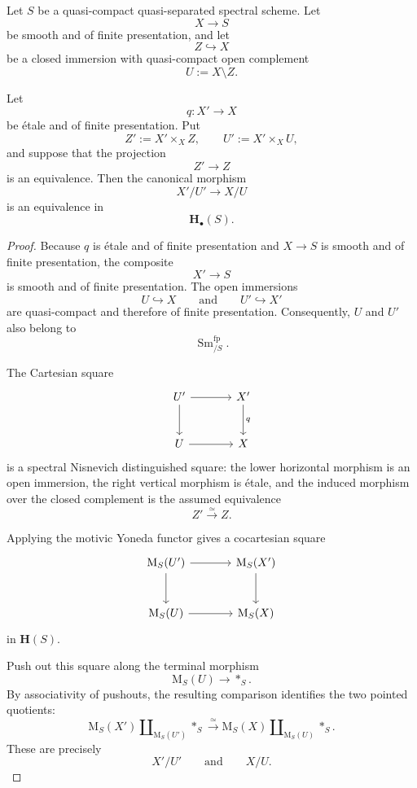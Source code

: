 \begin{proposition}
\label{prop:nisnevich-excision-closed-pairs}
Let \(S\) be a quasi-compact quasi-separated spectral scheme.  Let
\[
    X
    \longrightarrow
    S
\]
be smooth and of finite presentation, and let
\[
    Z
    \hookrightarrow
    X
\]
be a closed immersion with quasi-compact open complement
\[
    U
    :=
    X\setminus Z.
\]

Let
\[
    q
    \colon
    X'
    \longrightarrow
    X
\]
be étale and of finite presentation.  Put
\[
    Z'
    :=
    X'\times_XZ,
    \qquad
    U'
    :=
    X'\times_XU,
\]
and suppose that the projection
\[
    Z'
    \longrightarrow
    Z
\]
is an equivalence.  Then the canonical morphism
\[
    X'/U'
    \longrightarrow
    X/U
\]
is an equivalence in
\[
    \mathbf H_\bullet(S).
\]
\end{proposition}

\begin{proof}
Because \(q\) is étale and of finite presentation and
\(X\to S\) is smooth and of finite presentation, the composite
\[
    X'
    \longrightarrow
    S
\]
is smooth and of finite presentation.  The open immersions
\[
    U
    \hookrightarrow
    X
    \qquad\text{and}\qquad
    U'
    \hookrightarrow
    X'
\]
are quasi-compact and therefore of finite presentation.  Consequently,
\(U\) and \(U'\) also belong to
\[
    \operatorname{Sm}^{\mathrm{fp}}_{/S}.
\]

The Cartesian square
\[
\begin{tikzcd}[column sep=large, row sep=large]
    U'
        \arrow[r]
        \arrow[d]
    &
    X'
        \arrow[d, "q"]
    \\
    U
        \arrow[r]
    &
    X
\end{tikzcd}
\]
is a spectral Nisnevich distinguished square: the lower horizontal
morphism is an open immersion, the right vertical morphism is étale,
and the induced morphism over the closed complement is the assumed
equivalence
\[
    Z'
    \xrightarrow{\simeq}
    Z.
\]

Applying the motivic Yoneda functor gives a cocartesian square
\[
\begin{tikzcd}[column sep=large, row sep=large]
    \mathrm M_S(U')
        \arrow[r]
        \arrow[d]
    &
    \mathrm M_S(X')
        \arrow[d]
    \\
    \mathrm M_S(U)
        \arrow[r]
    &
    \mathrm M_S(X)
\end{tikzcd}
\]
in \(\mathbf H(S)\).

Push out this square along the terminal morphism
\[
    \mathrm M_S(U)
    \longrightarrow
    *_S.
\]
By associativity of pushouts, the resulting comparison identifies the
two pointed quotients:
\[
    \mathrm M_S(X')
    \amalg_{\mathrm M_S(U')}
    *_S
    \xrightarrow{\simeq}
    \mathrm M_S(X)
    \amalg_{\mathrm M_S(U)}
    *_S.
\]
These are precisely
\[
    X'/U'
    \qquad\text{and}\qquad
    X/U.
\]
\end{proof}

